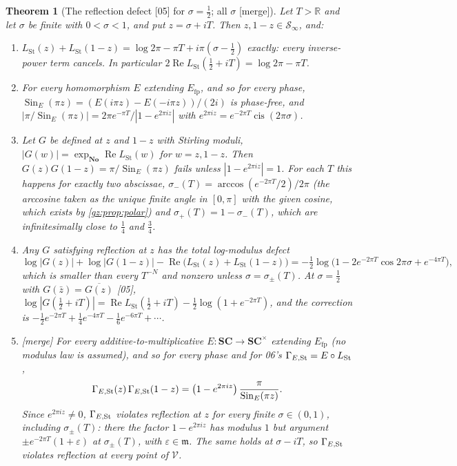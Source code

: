 \documentclass[11pt,a4paper]{article}
\numberwithin{equation}{section}
\newtheorem{theorem}{Theorem}[section]
\theoremstyle{definition}
\theoremstyle{remark}
\newcommand{\No}{\mathbf{No}}
\newcommand{\SC}{\mathbf{SC}}
\newcommand{\R}{\mathbb R}
\newcommand{\mm}{\mathfrak m}
\newcommand{\eps}{\varepsilon}
\renewcommand{\Re}{\operatorname{Re}}
\newcommand{\cis}{\operatorname{cis}}
\newcommand{\Efp}{E_{\mathrm{fp}}}
\newcommand{\Sin}{\operatorname{Sin}}
\newcommand{\LSt}{L_{\mathrm{St}}}
\newcommand{\Sinf}{\mathcal S_{\infty}}
\newcommand{\Vs}{\mathcal V}
\newcommand{\src}[1]{\textup{[#1]}}
\newcommand{\merge}{\textup{[merge]}}
\begin{document}
\begin{theorem}[The reflection defect \src{05} for $\sigma=\tfrac12$; all $\sigma$ \merge]\label{gz:thm:strip}
Let $T>\R$ and let $\sigma$ be finite with $0<\sigma<1$, and put
$z=\sigma+iT$. Then $z,1-z\in\Sinf$, and:
\begin{enumerate}[label=(\alph*)]
\item $\LSt(z)+\LSt(1-z)=\log2\pi-\pi T+i\pi(\sigma-\tfrac12)$ exactly: every
 inverse-power term cancels. In particular $2\Re\LSt(\tfrac12+iT)=\log2\pi-\pi T$.
\item For every homomorphism $E$ extending $\Efp$, and so for every phase,
 $\Sin_E(\pi z)=(E(i\pi z)-E(-i\pi z))/(2i)$ is phase-free, and
 $|\pi/\Sin_E(\pi z)|=2\pi e^{-\pi T}/|1-e^{2\pi iz}|$ with
 $e^{2\pi iz}=e^{-2\pi T}\cis(2\pi\sigma)$.
\item Let $G$ be defined at $z$ and $1-z$ with Stirling moduli,
 $|G(w)|=\exp_{\No}\Re\LSt(w)$ for $w=z,1-z$. Then
 $G(z)G(1-z)=\pi/\Sin_E(\pi z)$ fails unless $|1-e^{2\pi iz}|=1$. For each $T$
 this happens for exactly two abscissae, $\sigma_-(T)=\arccos(e^{-2\pi T}/2)/2\pi$
 (the arccosine taken as the unique finite angle in $[0,\pi]$ with the given
 cosine, which exists by \cref{gz:prop:polar})
 and $\sigma_+(T)=1-\sigma_-(T)$, which are infinitesimally close to
 $\tfrac14$ and $\tfrac34$.
\item Any $G$ satisfying reflection at $z$ has the total log-modulus defect
 \[
 \log|G(z)|+\log|G(1-z)|-\Re\bigl(\LSt(z)+\LSt(1-z)\bigr)=-\tfrac12\log\bigl(1-2e^{-2\pi T}\cos2\pi\sigma+e^{-4\pi T}\bigr),
 \]
 which is smaller than every $T^{-N}$ and nonzero unless $\sigma=\sigma_\pm(T)$.
 At $\sigma=\tfrac12$ with $G(\bar z)=\overline{G(z)}$ \src{05},
 $\log|G(\tfrac12+iT)|=\Re\LSt(\tfrac12+iT)-\tfrac12\log(1+e^{-2\pi T})$,
 and the correction is $-\tfrac12e^{-2\pi T}+\tfrac14e^{-4\pi T}-\tfrac16e^{-6\pi T}+\cdots$.
\item \merge{} For every additive-to-multiplicative $E:\SC\to\SC^\times$
 extending $\Efp$ (no modulus law is assumed), and so for every phase and
 for 06's $\Gamma_{E,\rm St}=E\circ\LSt$,
 \[
 \Gamma_{E,\rm St}(z)\,\Gamma_{E,\rm St}(1-z)=\bigl(1-e^{2\pi iz}\bigr)\,\frac\pi{\Sin_E(\pi z)} .
 \]
 Since $e^{2\pi iz}\ne0$, $\Gamma_{E,\rm St}$ violates reflection at $z$ for
 every finite $\sigma\in(0,1)$, including $\sigma_\pm(T)$: there the factor
 $1-e^{2\pi iz}$ has modulus $1$ but argument $\pm e^{-2\pi T}(1+\eps)$
 at $\sigma_\pm(T)$, with $\eps\in\mm$. The same holds at $\sigma-iT$, so $\Gamma_{E,\rm St}$
 violates reflection at every point of $\Vs$.
\end{enumerate}
\end{theorem}
\end{document}
